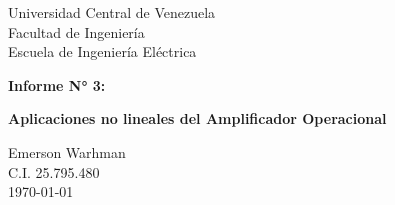 \begin{titlepage}
    \centering
    \Large
    Universidad Central de Venezuela\\
    Facultad de Ingeniería\\
    Escuela de Ingeniería Eléctrica
    \vspace*{8cm}

    \Huge
    \textbf{Informe N° 3:} 

    \textbf{Aplicaciones no lineales del Amplificador Operacional}
    \vfill


    \Large

    Emerson Warhman \\
    C.I. 25.795.480 \\
    \today

\end{titlepage}